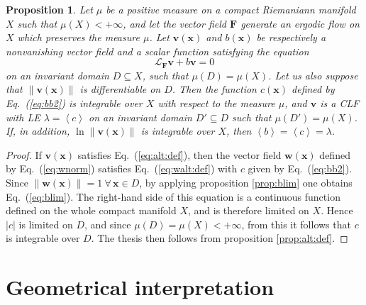 \documentclass{article}
\theoremstyle{plain}
\newtheorem{proposition}[theorem]{Proposition}
\theoremstyle{definition}
\theoremstyle{remark}
\newcommand{\vect}[1]{\boldsymbol{#1}}
\begin{document}
\begin{proposition}
  \label{prop:alt:def2}
Let $\mu$ be a positive measure on a compact Riemaniann manifold $X$ such
that $\mu(X)<+\infty$, and let the vector field $\vect{F}$ generate an
ergodic flow on $X$ which preserves the measure $\mu$.  Let $\vect{v}(\vect {x})$
and $b(\vect {x})$ be respectively a nonvanishing vector field and a scalar
function satisfying the equation
\[
 \mathcal{L}_{\vect{F}} \vect{v} + b \vect v = 0 
\]
on an invariant domain \mbox{$D\subseteq X$}, such that
$\mu(D)=\mu(X)$. Let us also suppose that 
$\lVert \vect{v}\left(\vect {x}\right) \rVert$ is differentiable on $D$. 
Then the function $c(\vect{x})$ defined
by Eq.~(\ref{eq:bb2})
is integrable over $X$ with respect to the measure $\mu$, and
$\vect{v}$ is a CLF with LE $\lambda=\left<c\right>$ on
an invariant domain $D'\subseteq D$ such that $\mu(D')=\mu(X)$. If, in
addition, $\ln \lVert \vect{v}\left(\vect {x}\right) \rVert$ is
integrable over $X$, then $\left<b\right>=\left<c\right>=\lambda$.
\end{proposition}
\begin{proof}
If $\vect{v}(\vect{x})$ satisfies Eq.~(\ref{eq:alt:def}), then
the vector field $\vect{w}(\vect{x})$ defined by Eq.~(\ref{eq:wnorm})
satisfies Eq.~(\ref{eq:walt:def}) with $c$ given by Eq.~(\ref{eq:bb2}).
Since $\lVert \vect{w}(\vect{x})\rVert=1\ \forall\,\vect{x}\in D$, 
by applying proposition \ref{prop:blim} one obtains Eq.~(\ref{eq:blim}).
The right-hand side of this equation is a continuous function
defined on the whole compact manifold $X$, and is therefore limited on $X$.
Hence $|c|$ is limited on $D$, and since $\mu(D)=\mu(X)<+\infty$,
from this it follows that $c$ is integrable over $D$. The thesis then
follows from proposition \ref{prop:alt:def}.
\end{proof}


\section{Geometrical interpretation}
\end{document}
